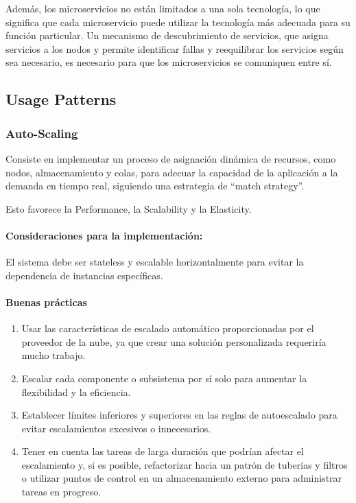 \documentclass{article}
\begin{document}
		Además, los microservicios no están limitados a una sola tecnología, lo que significa que cada microservicio puede utilizar la tecnología más adecuada para su función particular. Un mecanismo de descubrimiento de servicios, que asigna servicios a los nodos y permite identificar fallas y reequilibrar los servicios según sea necesario, es necesario para que los microservicios se comuniquen entre sí.
		
		\subsection{Usage Patterns}
		\subsubsection{Auto-Scaling}\label{sec:auto_scaling}
		Consiste en implementar un proceso de asignación dinámica de recursos, como nodos, almacenamiento y colas, para adecuar la capacidad de la aplicación a la demanda en tiempo real, siguiendo una estrategia de ``match strategy''.
		
		Esto favorece la Performance, la Scalability y la Elasticity.
		
		\paragraph{Consideraciones para la implementación:} 		
		El sistema debe ser stateless y escalable horizontalmente para evitar la dependencia de instancias específicas.
		
		\paragraph{Buenas prácticas} 		
			\begin{enumerate}
				\item Usar las características de escalado automático proporcionadas por el proveedor de la nube, ya que crear una solución personalizada requeriría mucho trabajo. 
				\item Escalar cada componente o subsistema por sí solo para aumentar la flexibilidad y la eficiencia.
				\item Establecer límites inferiores y superiores en las reglas de autoescalado para evitar escalamientos excesivos o innecesarios.
				\item Tener en cuenta las tareas de larga duración que podrían afectar el escalamiento y, si es posible, refactorizar hacia un patrón de tuberías y filtros o utilizar puntos de control en un almacenamiento externo para administrar tareas en progreso.
			\end{enumerate}
		
\end{document}
